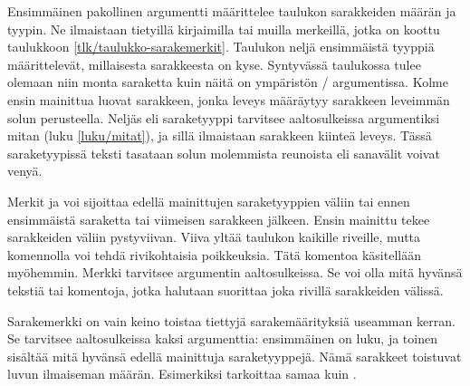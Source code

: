 Ensimmäinen pakollinen argumentti  määrittelee
taulukon sarakkeiden määrän ja tyypin. Ne ilmaistaan tietyillä
kirjaimilla tai muilla merkeillä, jotka on koottu taulukkoon
\ref{tlk/taulukko-sarakemerkit}. Taulukon neljä ensimmäistä tyyppiä
 määrittelevät, millaisesta sarakkeesta on kyse. Syntyvässä
taulukossa tulee olemaan niin monta saraketta kuin näitä on ympäristön
\-/ argumentissa. Kolme ensin mainittua luovat
sarakkeen, jonka leveys määräytyy sarakkeen leveimmän solun perusteella.
Neljäs eli saraketyyppi  tarvitsee aaltosulkeissa argumentiksi
mitan (luku \ref{luku/mitat}), ja sillä ilmaistaan sarakkeen kiinteä
leveys. Tässä saraketyypissä teksti tasataan solun molemmista reunoista
eli sanavälit voivat venyä.

Merkit \koodi{|} ja  voi sijoittaa edellä mainittujen
saraketyyppien väliin tai ennen ensimmäistä saraketta tai viimeisen
sarakkeen jälkeen. Ensin mainittu tekee sarakkeiden väliin pystyviivan.
Viiva yltää taulukon kaikille riveille, mutta komennolla
 voi tehdä rivikohtaisia poikkeuksia. Tätä komentoa
käsitellään myöhemmin. Merkki  tarvitsee argumentin
aaltosulkeissa. Se voi olla mitä hyvänsä tekstiä tai komentoja, jotka
halutaan suorittaa joka rivillä sarakkeiden välissä.

Sarakemerkki \koodi{*} on vain keino toistaa tiettyjä sarakemäärityksiä
useamman kerran. Se tarvitsee aaltosulkeissa kaksi argumenttia:
ensimmäinen on luku, ja toinen sisältää mitä hyvänsä edellä mainittuja
saraketyyppejä. Nämä sarakkeet toistuvat luvun ilmaiseman määrän.
Esimerkiksi  tarkoittaa samaa kuin
.

